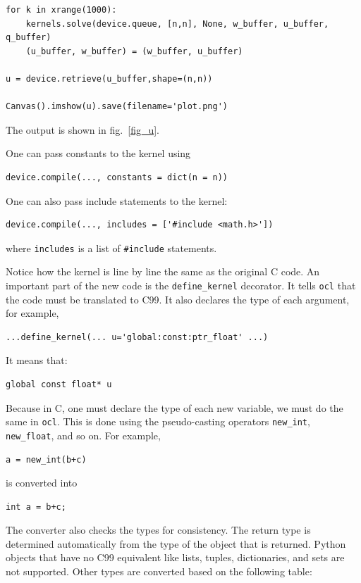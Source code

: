\documentclass[justified,sixbynine]{tufte-book}
\def\ft{\small\tt}
\theoremstyle{plain}%
\theoremstyle{definition}
\theoremstyle{remark}
\begin{document}
\begin{fullwidth}
\begin{lstlisting}
for k in xrange(1000):
    kernels.solve(device.queue, [n,n], None, w_buffer, u_buffer, q_buffer)
    (u_buffer, w_buffer) = (w_buffer, u_buffer)

u = device.retrieve(u_buffer,shape=(n,n))

Canvas().imshow(u).save(filename='plot.png')
\end{lstlisting}

The output is shown in fig.~\ref{fig_u}.

One can pass constants to the kernel using
\begin{lstlisting}
device.compile(..., constants = dict(n = n))
\end{lstlisting}

One can also pass include statements to the kernel:
\begin{lstlisting}
device.compile(..., includes = ['#include <math.h>'])
\end{lstlisting}
where {\ft includes} is a list of {\ft \#include} statements.

Notice how the kernel is line by line the same as the original C code.
An important part of the new code is the {\ft define\_kernel} decorator. It tells {\ft ocl} that the code must be translated to C99. It also declares the type of each argument, for example,
\begin{lstlisting}
...define_kernel(... u='global:const:ptr_float' ...)
\end{lstlisting}
It means that:
\begin{lstlisting}
global const float* u
\end{lstlisting}

Because in C, one must declare the type of each new variable, we must do the same in {\ft ocl}.
This is done using the  pseudo-casting operators {\ft new\_int}, {\ft new\_float}, and so on.  For example,
\begin{lstlisting}
a = new_int(b+c)
\end{lstlisting}
is converted into
\begin{lstlisting}
int a = b+c;
\end{lstlisting}

The converter also checks the types for consistency. The return type is determined automatically from the type of the object that is returned. Python objects that have no C99 equivalent like lists, tuples, dictionaries, and sets are not supported. Other types are converted based on the following table:


\end{fullwidth}
\end{document}
